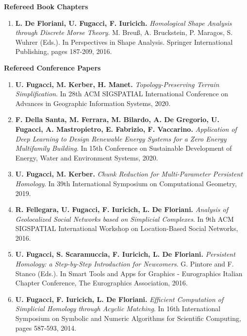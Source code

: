 \documentclass[11pt]{article}
\begin{document}
\noindent
{\bf Refereed Book Chapters}

\begin{enumerate}

\item {\bf L. De Floriani, U. Fugacci, F. Iuricich.} {\em Homological Shape Analysis through Discrete Morse Theory}.  M. Breu{\ss}, A. Bruckstein, P. Maragos, S. Wuhrer (Eds.). In Perspectives in Shape Analysis. Springer International Publishing, pages 187-209, 2016.

\end{enumerate}
\vspace*{3ex}

\noindent
{\bf Refereed Conference Papers}
\begin{enumerate}

\item {\bf U. Fugacci, M. Kerber, H. Manet.} {\em Topology-Preserving Terrain Simplification}. In 28th ACM SIGSPATIAL International Conference on Advances in Geographic Information Systems, 2020.

\item {\bf F. Della Santa, M. Ferrara, M. Bilardo, A. De Gregorio, U. Fugacci, A. Mastropietro, E. Fabrizio, F. Vaccarino.} {\em Application of Deep Learning to Design Renewable Energy Systems for a Zero Energy Multifamily Building}. In 15th Conference on Sustainable Development of Energy, Water and Environment Systems, 2020.

\item {\bf U. Fugacci, M. Kerber.} {\em Chunk Reduction for Multi-Parameter Persistent Homology}. In 39th International Symposium on Computational Geometry, 2019.

\item {\bf R. Fellegara, U. Fugacci, F. Iuricich, L. De Floriani.} {\em Analysis of Geolocalized Social Networks based on Simplicial Complexes}. In 9th ACM SIGSPATIAL International Workshop on Location-Based Social Networks, 2016.

\item {\bf U. Fugacci, S. Scaramuccia, F. Iuricich, L. De Floriani.} {\em Persistent Homology: a Step-by-Step Introduction for Newcomers}. G. Pintore and F. Stanco (Eds.). In Smart Tools and Apps for Graphics - Eurographics Italian Chapter Conference, The Eurographics Association, 2016.

\item {\bf U. Fugacci, F. Iuricich, L. De Floriani.} {\em Efficient Computation of Simplicial Homology through Acyclic Matching}. In 16th International Symposium on Symbolic and Numeric Algorithms for Scientific Computing, pages 587-593, 2014.

\end{enumerate}
\vspace*{1ex}
\end{document}
